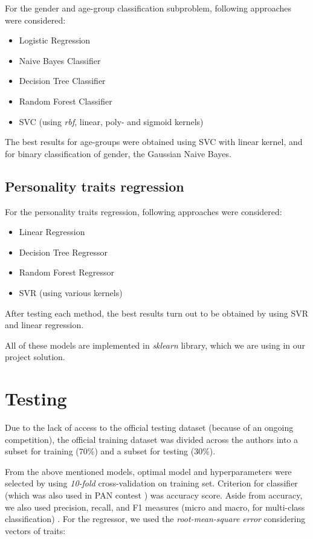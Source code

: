 \documentclass[10pt, a4paper]{article}
\begin{document}
For the gender and age-group classification subproblem, following approaches were considered:
\begin{itemize}
	\item Logistic Regression
	\item Naive Bayes Classifier
	\item Decision Tree Classifier
	\item Random Forest Classifier
	\item SVC (using \textit{rbf}, linear, poly- and sigmoid kernels)
\end{itemize}
\noindent The best results for age-groups were obtained using SVC with linear kernel, and for binary classification of gender, the Gaussian Naive Bayes.

\subsection{Personality traits regression}
For the personality traits regression, following approaches were considered:
\begin{itemize}
	\item Linear Regression
	\item Decision Tree Regressor
	\item Random Forest Regressor
	\item SVR (using various kernels)
\end{itemize}
\noindent After testing each method, the best results turn out to be obtained by using SVR and linear regression.

All of these models are implemented in \textit{sklearn} library, which we are using in our project solution.

\section{Testing}
Due to the lack of access to the official testing dataset (because of an ongoing competition), the official training dataset was divided across the authors into a subset for training (70\%) and a subset for testing (30\%). 

From the above mentioned models, optimal model and hyperparameters were selected by using \textit{10-fold} cross-validation on training set.
Criterion for classifier (which was also used in PAN contest \citep{panoverview}) was accuracy score.
Aside from accuracy, we also used precision, recall, and F1 measures (micro and macro, for multi-class classification) \citep{panoverviewl}.
For the regressor, we used the \textit{root-mean-square error} considering vectors of traits:
\end{document}
